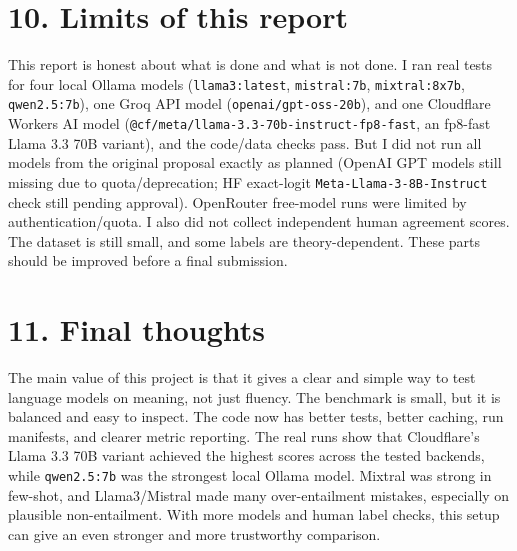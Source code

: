 \documentclass[11pt, a4paper]{article}
\begin{document}
\section*{\color{bambergnavy} 10. Limits of this report}
This report is honest about what is done and what is not done. I ran real tests for four local Ollama models (\texttt{llama3:latest}, \texttt{mistral:7b}, \texttt{mixtral:8x7b}, \texttt{qwen2.5:7b}), one Groq API model (\texttt{openai/gpt-oss-20b}), and one Cloudflare Workers AI model (\texttt{@cf/meta/llama-3.3-70b-instruct-fp8-fast}, an fp8-fast Llama 3.3 70B variant), and the code/data checks pass. But I did not run all models from the original proposal exactly as planned (OpenAI GPT models still missing due to quota/deprecation; HF exact-logit \texttt{Meta-Llama-3-8B-Instruct} check still pending approval). OpenRouter free-model runs were limited by authentication/quota. I also did not collect independent human agreement scores. The dataset is still small, and some labels are theory-dependent. These parts should be improved before a final submission.

\FloatBarrier
{}
\section*{\color{bambergnavy} 11. Final thoughts}
The main value of this project is that it gives a clear and simple way to test language models on meaning, not just fluency. The benchmark is small, but it is balanced and easy to inspect. The code now has better tests, better caching, run manifests, and clearer metric reporting. The real runs show that Cloudflare's Llama 3.3 70B variant achieved the highest scores across the tested backends, while \texttt{qwen2.5:7b} was the strongest local Ollama model. Mixtral was strong in few-shot, and Llama3/Mistral made many over-entailment mistakes, especially on plausible non-entailment. With more models and human label checks, this setup can give an even stronger and more trustworthy comparison.

\FloatBarrier
{}
\end{document}
